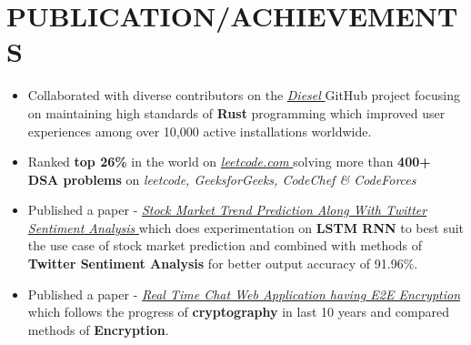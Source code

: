 \documentclass[letterpaper,10pt]{article}
\newcommand{\resumeItem}[1]{
  \item\small{
    {#1 \vspace{-2pt}}
  }
}
\newcommand{\resumeItemListStart}{\begin{itemize}}
\newcommand{\resumeItemListEnd}{\end{itemize}\vspace{-5pt}}
\begin{document}
\section{PUBLICATION/ACHIEVEMENTS}
\resumeItemListStart
\resumeItem{\normalsize{Collaborated with diverse contributors on the \href{https://github.com/diesel-rs/diesel}{\textit{Diesel} {\raisebox{-0.1\height}\faExternalLink}} GitHub project focusing on maintaining high standards of \textbf{Rust} programming which improved user experiences among over 10,000 active installations worldwide.}}
  \vspace{-4pt}
  \resumeItem{\normalsize{Ranked \textbf{top 26\%} in the world on \href{https://leetcode.com/Raijin_codes}{\textit{leetcode.com} {\raisebox{-0.1\height}\faExternalLink}} solving more than \textbf{400+ DSA problems} on \textit{leetcode, GeeksforGeeks, CodeChef \& CodeForces}}}
  \vspace{-4pt}
  \resumeItem{\normalsize{Published a paper - \href{https://www.springerprofessional.de/en/stock-market-trend-prediction-along-with-twitter-sentiment-analy/24659292}{\textit{Stock Market Trend Prediction Along With Twitter Sentiment Analysis }}\href{https://www.springerprofessional.de/en/stock-market-trend-prediction-along-with-twitter-sentiment-analy/24659292}{\raisebox{-0.1\height}\faExternalLink }which does experimentation on \textbf{LSTM RNN} to best suit the use case of stock market prediction and combined with methods of \textbf{Twitter Sentiment Analysis} for better output accuracy of 91.96\%.}}
  \vspace{-4pt}
  \resumeItem{\normalsize{Published a paper - \href{https://www.ijraset.com/fileserve.php?FID=35305}{\textit{Real Time Chat Web Application having E2E Encryption }}\href{https://www.ijraset.com/fileserve.php?FID=35305}{\raisebox{-0.1\height}\faExternalLink } which follows the progress of \textbf{cryptography} in last 10 years and compared methods of \textbf{Encryption}.}}
  \vspace{-4pt}
\resumeItemListEnd
\end{document}
